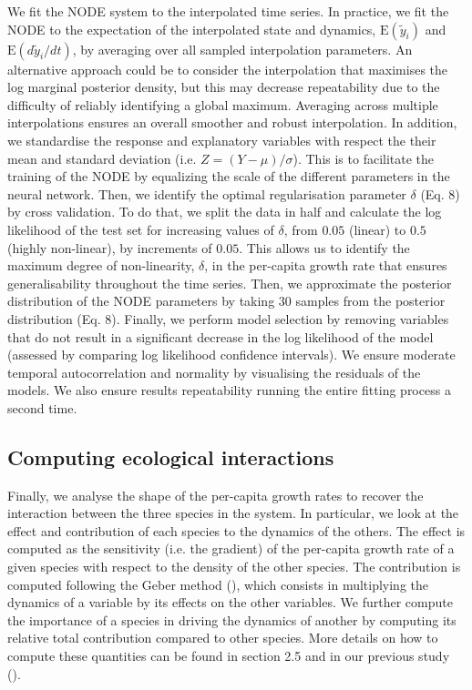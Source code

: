 \documentclass[11pt, oneside]{article}
\begin{document}
We fit the NODE system to the interpolated time series.
In practice, we fit the NODE to the expectation of the interpolated state and dynamics, $\mathrm{E}(\tilde{y}_i)$ and $\mathrm{E}(d\tilde{y}_i/dt)$, by averaging over all sampled interpolation parameters.
An alternative approach could be to consider the interpolation that maximises the log marginal posterior density, but this may decrease repeatability due to the difficulty of reliably identifying a global maximum.
Averaging across multiple interpolations ensures an overall smoother and robust interpolation. 
In addition, we standardise the response and explanatory variables with respect the their mean and standard deviation (i.e. $Z=(Y-\mu)/\sigma$).
This is to facilitate the training of the NODE by equalizing the scale of the different parameters in the neural network.
Then, we identify the optimal regularisation parameter $\delta$ (Eq. 8) by cross validation.
To do that, we split the data in half and calculate the log likelihood of the test set for increasing values of $\delta$, from $0.05$ (linear) to $0.5$ (highly non-linear), by increments of $0.05$.
This allows us to identify the maximum degree of non-linearity, $\delta$, in the per-capita growth rate that ensures generalisability throughout the time series.
Then, we approximate the posterior distribution of the NODE parameters by taking 30 samples from the posterior distribution (Eq. 8).
Finally, we perform model selection by removing variables that do not result in a significant decrease in the log likelihood of the model (assessed by comparing log likelihood confidence intervals).
We ensure moderate temporal autocorrelation and normality by visualising the residuals of the models.
We also ensure results repeatability running the entire fitting process a second time.

\subsection{Computing ecological interactions}

Finally, we analyse the shape of the per-capita growth rates to recover the interaction between the three species in the system.
In particular, we look at the effect and contribution of each species to the dynamics of the others.
The effect is computed as the sensitivity (i.e. the gradient) of the per-capita growth rate of a given species with respect to the density of the other species.
The contribution is computed following the Geber method (\cite{Hairston2005}), which consists in multiplying the dynamics of a variable by its effects on the other variables.
We further compute the importance of a species in driving the dynamics of another by computing its relative total contribution compared to other species.
More details on how to compute these quantities can be found in section 2.5 and in our previous study (\cite{Bonnaffe2021a}).
\end{document}
